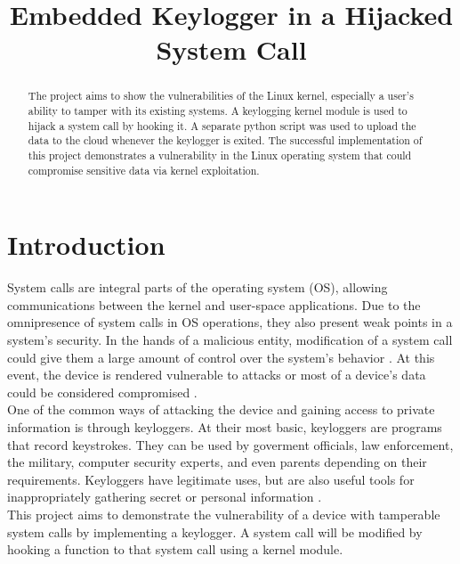 \documentclass[conference]{IEEEtran}
\newcommand\tab[1][0.5cm]{\hspace*{#1}}
\begin{document}
	
	\title{Embedded Keylogger in a Hijacked System Call\\
	}
	
	\author{
		\and
		}
	
	\maketitle
	
	\begin{abstract}
		The project aims to show the vulnerabilities of the Linux kernel, especially a user's ability to tamper with its existing systems. A keylogging kernel module is used to hijack a system call by hooking it. A separate python script was used to upload the data to the cloud whenever the keylogger is exited. The successful implementation of this project demonstrates a vulnerability in the Linux operating system that could compromise sensitive data via kernel exploitation.	
	\end{abstract}
	
	\section{Introduction}
System calls are integral parts of the operating system (OS), allowing communications between the kernel and user-space applications. Due to the omnipresence of system calls in OS operations, they also present weak points in a system's security. In the hands of a malicious entity, modification of a system call could give them a large amount of control over the system's behavior \cite{1}. At this event, the device is rendered vulnerable to attacks or most of a device's data could be considered compromised \cite{27}. \\
\tab One of the common ways of attacking the device and gaining access to private information is through keyloggers. At their most basic, keyloggers are programs that record keystrokes. They can be used by goverment officials, law enforcement, the military, computer security experts, and even parents depending on their requirements. Keyloggers have legitimate uses, but are also useful tools for inappropriately gathering secret or personal information \cite{28}. \\
\tab This project aims to demonstrate the vulnerability of a device with tamperable system calls by implementing a keylogger. A system call will be modified by hooking a function to that system call using a kernel module.
\end{document}
